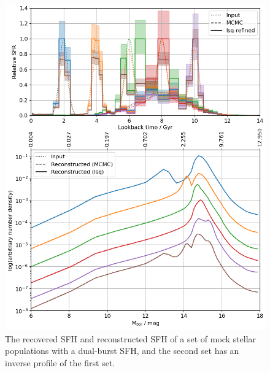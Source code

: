 \documentclass[fleqn,usenatbib]{mnras}
\begin{document}
\begin{figure}
  \includegraphics[width=\columnwidth]{figures/fig_02_two_bursts_wdlf.png} 
  \caption{The recovered SFH and reconstructed SFH of a set of mock stellar populations with a dual-burst SFH, and the second set has an inverse profile of the first set.}
  \label{fig:dual_burst_sfh}
\end{figure}
\end{document}
